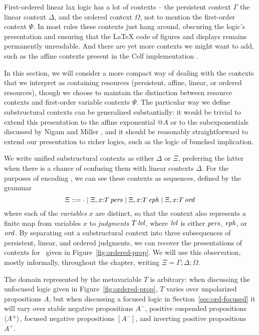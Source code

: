 First-ordered linear lax logic has a lot of contexts -- the persistent
context $\Gamma$ the linear context $\Delta$, and the ordered context
$\Omega$, not to mention the first-order context $\Psi$. In most rules
these contexts just hang around, obscuring the logic's presentation
and ensuring that the {\LaTeX} code of figures and displays remains
permanently unreadable. And there are yet more contexts we might want to 
add, such as the affine contexts present in the Celf implementation
\cite{schacknielsen08celf}.

In this section, we will consider a more compact way of dealing with
the contexts that we interpret as containing resources (persistent,
affine, linear, or ordered resources), though we choose to maintain
the distinction between resource contexts and first-order variable
contexts $\Psi$.  The particular way we define substructural contexts
can be generalized substantially: it would be trivial to extend this
presentation to the affine exponential ${@}A$ or to the subexponentials
discussed by Nigam and Miller \cite{nigam09algorithmic}, and it should
be reasonably straightforward to extend our presentation to richer
logics, such as the logic of bunched implication.

We write unified substructural contexts as either $\Delta$ or $\Xi$,
preferring the latter when there is a chance of confusing them with
linear contexts $\Delta$. For the purposes of encoding \ollll, we can
see these contexts as sequences, defined by the grammar
\[
\Xi ::= \cdot 
  \mid \Xi, x{:}{T}\,{{\it pers}}
  \mid \Xi, x{:}{T}\,{{\it eph}}
  \mid \Xi, x{:}{T}\,{{\it ord}}
\]
where each of the {\em variables} $x$ are distinct, so that the
context also represents a finite map from variables $x$ to {\it
  judgments} ${T}\,{{\it lvl}}$, where ${\it lvl}$ is either ${\it pers}$, ${\it eph}$,
or ${\it ord}$.  By separating out a substructural context into three
subsequences of persistent, linear, and ordered judgments, we can
recover the presentations of contexts for \ollll~given in
Figure~\ref{fig:ordered-prop}. We will use this observation, mostly
informally, throughout the chapter, writing $\Xi = \Gamma; \Delta;
\Omega$.

The domain represented by the metavariable $T$ is arbitrary: when
discussing the unfocused logic given in Figure~\ref{fig:ordered-prop},
$T$ varies over unpolarized propositions $A$, but when discussing a
focused logic in Section~\ref{sec:ord-focused} it will vary over
stable negative propositions $A^-$, positive suspended propositions
$\langle {A^+} \rangle$, focused negative propositions $[A^-]$, and inverting
positive propositions $A^+$.



